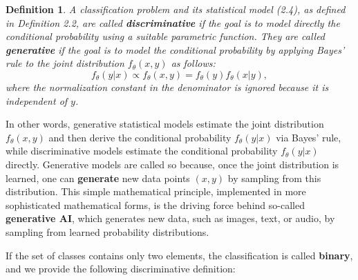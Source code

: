 \documentclass{report}
\newtheorem{definition}{Definition}[chapter]
\begin{document}
\begin{definition}
A classification problem and its statistical model (2.4), as defined in Definition 2.2, are called \textbf{discriminative} if the goal is to model directly the conditional probability using a suitable parametric function. They are called \textbf{generative} if the goal is to model the conditional probability by applying Bayes' rule to the joint distribution $f_\theta(x,y)$ as follows:
\begin{equation}
f_\theta(y|x) \propto f_\theta(x,y) = f_\theta(y)f_\theta(x|y),
\end{equation}
where the normalization
constant in the denominator is ignored because it is independent of $y$.
\end{definition}

In other words, generative statistical models estimate the joint distribution $f_\theta(x,y)$ and then derive the conditional probability $f_\theta(y|x)$ via Bayes' rule, while discriminative models estimate the conditional probability $f_\theta(y|x)$ directly. Generative models are called so because, once the joint distribution is learned, one can \textbf{generate} new data points $(x,y)$ by sampling from this distribution. This simple mathematical principle, implemented in more sophisticated mathematical forms, is the driving force behind so-called \textbf{generative AI}, which generates new data, such as images, text, or audio, by sampling from learned probability distributions.

If the set of classes contains only two elements, the classification is called \textbf{binary}, and we provide the following discriminative definition:
\end{document}
